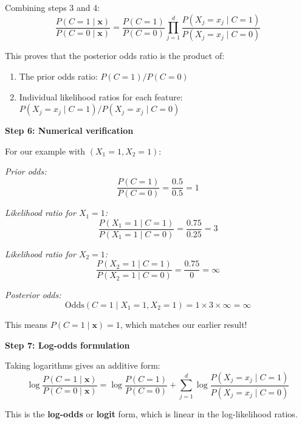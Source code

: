 \documentclass[12pt]{article}
\begin{document}
\begin{solution}
Combining steps 3 and 4:
\[
\boxed{
\frac{P(C=1 \mid \mathbf{x})}{P(C=0 \mid \mathbf{x})} = \frac{P(C=1)}{P(C=0)} \prod_{j=1}^{d} \frac{P(X_j = x_j \mid C=1)}{P(X_j = x_j \mid C=0)}
}
\]

This proves that the posterior odds ratio is the product of:
\begin{enumerate}
    \item The prior odds ratio: $P(C=1)/P(C=0)$
    \item Individual likelihood ratios for each feature: $P(X_j=x_j \mid C=1)/P(X_j=x_j \mid C=0)$
\end{enumerate}

\textbf{Step 6: Numerical verification}

For our example with $(X_1=1, X_2=1)$:

\textit{Prior odds:}
\[
\frac{P(C=1)}{P(C=0)} = \frac{0.5}{0.5} = 1
\]

\textit{Likelihood ratio for $X_1=1$:}
\[
\frac{P(X_1=1 \mid C=1)}{P(X_1=1 \mid C=0)} = \frac{0.75}{0.25} = 3
\]

\textit{Likelihood ratio for $X_2=1$:}
\[
\frac{P(X_2=1 \mid C=1)}{P(X_2=1 \mid C=0)} = \frac{0.75}{0} = \infty
\]

\textit{Posterior odds:}
\[
\text{Odds}(C=1 \mid X_1=1, X_2=1) = 1 \times 3 \times \infty = \infty
\]

This means $P(C=1 \mid \mathbf{x}) = 1$, which matches our earlier result!

\textbf{Step 7: Log-odds formulation}

Taking logarithms gives an additive form:
\[
\boxed{
\log \frac{P(C=1 \mid \mathbf{x})}{P(C=0 \mid \mathbf{x})} = \log \frac{P(C=1)}{P(C=0)} + \sum_{j=1}^{d} \log \frac{P(X_j = x_j \mid C=1)}{P(X_j = x_j \mid C=0)}
}
\]

This is the \textbf{log-odds} or \textbf{logit} form, which is linear in the log-likelihood ratios.
\end{solution}
\end{document}
